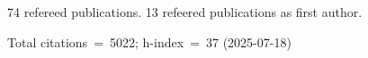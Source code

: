 74 refereed publications. 13 refeered publications as first author.

Total citations~=~5022; h-index~=~37 (2025-07-18)